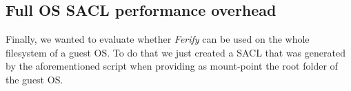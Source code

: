 \subsection{Full \ac{OS} \ac{SACL} performance overhead}

\par Finally, we wanted to evaluate whether \emph{Ferify} can be used on the whole filesystem of a guest \ac{OS}. To do that we just created a \ac{SACL} that was generated by the aforementioned script when providing as mount-point the root folder of the guest \ac{OS}.




